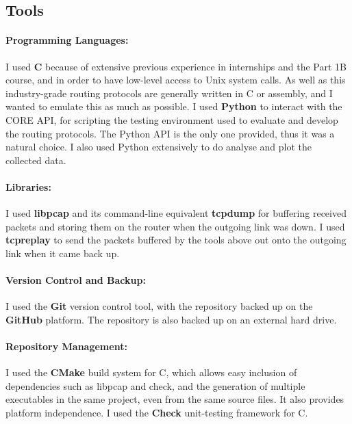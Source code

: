 \documentclass[withindex,glossary,openany]{cam-thesis}
\begin{document}
\subsection{Tools}

\paragraph{Programming Languages:}

I used \textbf{C} because of extensive previous experience in internships and the Part 1B course, and in order to have low-level access to Unix system calls. As well as this industry-grade routing protocols are generally written in C or assembly, and I wanted to emulate this as much as possible. I used \textbf{Python} to interact with the CORE API, for scripting the testing environment used to evaluate and develop the routing protocols. The Python API is the only one provided, thus it was a natural choice. I also used Python extensively to do analyse and plot the collected data.

\paragraph{Libraries:}

I used \textbf{libpcap} and its command-line equivalent \textbf{tcpdump} for buffering received packets and storing them on the router when the outgoing link was down. I used \textbf{tcpreplay} to send the packets buffered by the tools above out onto the outgoing link when it came back up.

\paragraph{Version Control and Backup:}

I used the \textbf{Git} version control tool, with the repository backed up on the \textbf{GitHub} platform. The repository is also backed up on an external hard drive.


\paragraph{Repository Management:}

I used the \textbf{CMake} build system for C, which allows easy inclusion of dependencies such as libpcap and check, and the generation of multiple executables in the same project, even from the same source files. It also provides platform independence. I used the \textbf{Check} unit-testing framework for C.
\end{document}
